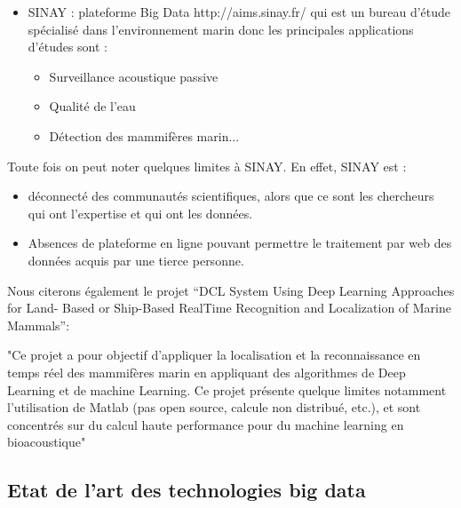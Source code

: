 \documentclass[a4paper]{article}
\begin{document}
\begin{itemize}

\item SINAY : plateforme Big Data http://aims.sinay.fr/ qui est un bureau d’étude spécialisé dans
l’environnement marin donc les principales applications d’études sont :

\begin{itemize}

\item Surveillance acoustique passive

\item Qualité de l’eau

\item Détection des mammifères marin...

\end{itemize}

\end{itemize}

Toute fois on peut noter quelques limites à SINAY. En effet, SINAY est :
\begin{itemize}
\item déconnecté des communautés scientifiques, alors que ce sont les chercheurs qui ont l’expertise et qui ont les données.

\item Absences de plateforme en ligne pouvant permettre le traitement par web des données acquis
par une tierce personne.
\end{itemize}

Nous citerons également le projet “DCL System Using Deep Learning Approaches for Land-
Based or Ship-Based RealTime Recognition and Localization of Marine Mammals”:


"Ce projet a pour objectif d’appliquer la localisation et la reconnaissance en temps réel des
mammifères marin en appliquant des algorithmes de Deep Learning et de machine Learning.
Ce projet présente quelque limites notamment l’utilisation de Matlab (pas open source, calcule
non distribué, etc.), et sont concentrés sur du calcul haute performance pour du machine
learning en bioacoustique"

\subsection{Etat de l’art des technologies big data}
\end{document}
